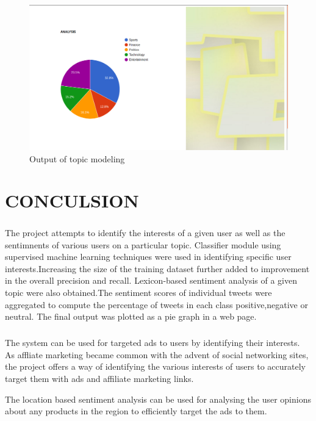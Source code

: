 \begin{figure}[h]
	\centering
	\includegraphics[width=0.9\linewidth]{sachin_topic_1.png}
	\caption{Output of topic modeling}
	\label{fig:expression01}
\end{figure}


\chapter{CONCULSION}

\paragraph{}
The project attempts to identify the interests of a given user as well as the sentimnents of various users on a particular topic. Classifier module using supervised machine learning techniques were used in identifying specific user interests.Increasing the size of the training dataset further added to improvement in the overall precision and recall. Lexicon-based sentiment analysis of a given topic were also  obtained.The sentiment scores of individual tweets were aggregated to compute the percentage of tweets in each class positive,negative or neutral. The final output was plotted as a pie graph in a web page. 

\paragraph{}
The system can be used for targeted ads to users by identifying their interests. As affliate marketing became common with the advent of social networking sites, the project offers a way of identifying the various interests of users to accurately target them with ads and affiliate marketing links.

The location based sentiment analysis can be used for analysing the user opinions about any products in the region to efficiently target the ads to them.
 
